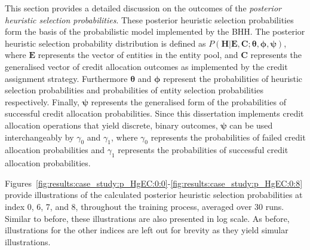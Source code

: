 This section provides a detailed discussion on the outcomes of the \textit{posterior heuristic selection probabilities}. These posterior heuristic selection probabilities form the basis of the probabilistic model implemented by the \acs{BHH}. The posterior heuristic selection probability distribution is defined as $P(\boldsymbol{H} \vert \boldsymbol{E}, \boldsymbol{C}; \boldsymbol{\theta}, \boldsymbol{\phi}, \boldsymbol{\psi})$, where $\boldsymbol{E}$ represents the vector of entities in the entity pool, and $\boldsymbol{C}$ represents the generalised vector of credit allocation outcomes as implemented by the credit assignment strategy. Furthermore $\boldsymbol{\theta}$ and $\boldsymbol{\phi}$ represent the probabilities of heuristic selection probabilities and probabilities of entity selection probabilities respectively. Finally, $\boldsymbol{\psi}$ represents the generalised form of the probabilities of successful credit allocation probabilities. Since this dissertation implements credit allocation operations that yield discrete, binary outcomes, $\boldsymbol{\psi}$ can be used interchangeably by $\gamma_{0}$ and $\gamma_{1}$, where $\gamma_{0}$ represents the probabilities of failed credit allocation probabilities and $\gamma_{1}$ represents the probabilities of successful credit allocation probabilities.

Figures~\ref{fig:results:case_study:p_HgEC:0:0}-\ref{fig:results:case_study:p_HgEC:0:8} provide illustrations of the calculated posterior heuristic selection probabilities at index 0, 6, 7, and 8, throughout the training process, averaged over 30 runs. Similar to before, these illustrations are also presented in log scale. As before, illustrations for the other indices are left out for brevity as they yield simular illustrations.

